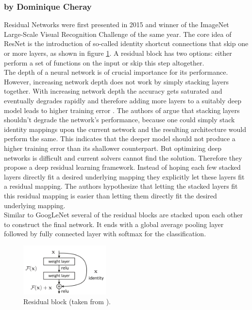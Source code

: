 \documentclass[11pt]{report}
\begin{document}
\subsubsection{by Dominique Cheray}
Residual Networks were first presented in 2015 and winner of the ImageNet
Large-Scale Visual Recognition Challenge of the same year. The core idea of
ResNet is the introduction of so-called identity shortcut connections that skip
one or more layers, as shown in figure \ref{ResidualBlock}. A residual block has
two options: either perform a set of functions on the input or skip this step
altogether. \\
The depth of a neural network is of crucial importance for its performance.
However, increasing network depth does not work by simply
stacking layers together. With increasing network depth the accuracy gets saturated
and eventually degrades rapidly and therefore adding more layers to a suitably
deep model leads to higher training error \cite{he2016deep}.
The authors of \cite{he2016deep} argue that stacking layers shouldn't degrade the network's
performance, because one could simply stack identity mappings upon the current
network and the resulting architecture would perform the same. This indicates
that the deeper model should not produce a higher training error than its
shallower counterpart. But optimizing deep networks is difficult and current
solvers cannot find the solution. Therefore they propose a deep residual
learning framework. Instead of hoping each few stacked layers directly fit a
desired underlying mapping they explicitly let these layers fit a residual
mapping. The authors hypothesize that letting the stacked layers fit this
residual mapping is easier than letting them directly fit the desired underlying
mapping. \\
Similar to GoogLeNet several of the residual blocks are stacked upon each other
to construct the final network. It ends with a global average pooling layer
followed by fully connected layer with softmax for the classification. 
\begin{figure}
  \centering
  \includegraphics[width=0.4\textwidth]{ResidualBlock}
  \caption{Residual block (taken from \cite{he2016deep}).}
  \label{ResidualBlock}
\end{figure}
\end{document}
